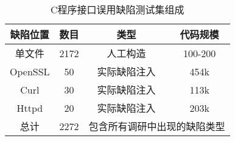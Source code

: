 \begin{table}[t]
	\centering
	\begin{minipage}[t]{0.6\linewidth} %
		\caption{C程序接口误用缺陷测试集组成}
		\label{tab:4-2-dataset}
			\begin{tabular}{cccc}
			\hline
			缺陷位置 & 数目& 类型& 代码规模\\
			\hline
			单文件 & 2172 & 人工构造 & 100-200\\
			OpenSSL & 50 & 实际缺陷注入 & 454k\\
			Curl & 30 & 实际缺陷注入 & 113k\\
			Httpd & 20 & 实际缺陷注入 & 203k\\
			总计 & 2272 & \multicolumn{2}{c}{包含所有调研中出现的缺陷类型} \\
			\hline
		\end{tabular}
	\end{minipage}
\end{table}